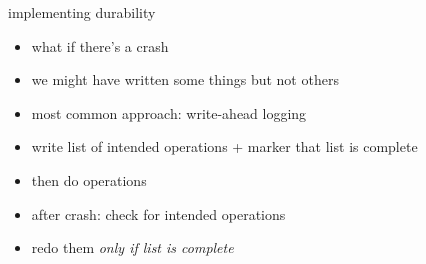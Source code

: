 

\begin{frame}{implementing durability}
    \begin{itemize}
    \item what if there's a crash
    \item we might have written some things but not others
    \item most common approach: write-ahead logging
    \vspace{.5cm}
    \item write list of intended operations + marker that list is complete
    \item then do operations
    \vspace{.5cm}
    \item after crash: check for intended operations
    \item redo them \textit{only if list is complete}
    \end{itemize}
\end{frame}
